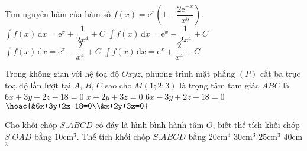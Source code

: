 \begin{ex}%
Tìm nguyên hàm của hàm số $f(x)=\mathrm{e}^x\left(1-\dfrac{2\mathrm{e}^{-x}}{x^5}\right)$.
\choice
{\True $\displaystyle\int f(x)\mathrm{\,d}x=\mathrm{e}^x+\dfrac{1}{2x^4}+C$}
{$\displaystyle\int f(x)\mathrm{\,d}x=\mathrm{e}^x-\dfrac{1}{2x^4}+C$}
{$\displaystyle\int f(x)\mathrm{\,d}x=\mathrm{e}^x-\dfrac{2}{x^4}+C$}
{$\displaystyle\int f(x)\mathrm{\,d}x=\mathrm{e}^x+\dfrac{2}{x^4}+C$}
\end{ex}
\begin{ex}%
Trong không gian với hệ toạ độ $Oxyz$, phương trình mặt phẳng $(P)$ cắt ba trục toạ độ lần lượt tại $A$, $B$, $C$ sao cho $M\left(1;2;3\right)$ là trọng tâm tam giác $ABC$ là
\choice
{\True $6x+3y+2z-18=0$}
{$x+2y+3z=0$}
{$6x-3y+2z-18=0$}
{$\hoac{&6x+3y+2z-18=0\\&x+2y+3z=0}$}
\end{ex}
\begin{ex}%
Cho khối chóp $S.ABCD$ có đáy là hình bình hành tâm $O$, biết thể tích khối chóp $S.OAD$ bằng $10$cm$^3$. Thể tích khối chóp $S.ABCD$ bằng
\choice
{$20$cm$^3$}
{$30$cm$^3$}
{$25$cm$^3$}
{\True $40$cm$^3$}
\end{ex}

